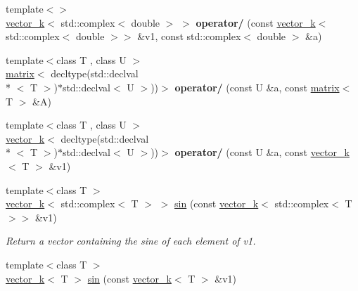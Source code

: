 \begin{DoxyCompactItemize}
\item 
\hypertarget{namespacekeycpp_aef7e4ab9c187ffa93e45ec90e2d1d5d4}{{\footnotesize template$<$$>$ }\\\hyperlink{classkeycpp_1_1vector__k}{vector\-\_\-k}$<$ std\-::complex$<$ double $>$ $>$ {\bfseries operator/} (const \hyperlink{classkeycpp_1_1vector__k}{vector\-\_\-k}$<$ std\-::complex$<$ double $>$$>$ \&v1, const std\-::complex$<$ double $>$ \&a)}\label{namespacekeycpp_aef7e4ab9c187ffa93e45ec90e2d1d5d4}

\item 
\hypertarget{namespacekeycpp_aafc0089bdf204385c1e627755c5070b0}{{\footnotesize template$<$class T , class U $>$ }\\\hyperlink{classkeycpp_1_1matrix}{matrix}$<$ decltype(std\-::declval\\*
$<$ T $>$)$\ast$std\-::declval$<$ U $>$))$>$ {\bfseries operator/} (const U \&a, const \hyperlink{classkeycpp_1_1matrix}{matrix}$<$ T $>$ \&A)}\label{namespacekeycpp_aafc0089bdf204385c1e627755c5070b0}

\item 
\hypertarget{namespacekeycpp_aa5daf45d6627feee18402005fcd83cfd}{{\footnotesize template$<$class T , class U $>$ }\\\hyperlink{classkeycpp_1_1vector__k}{vector\-\_\-k}$<$ decltype(std\-::declval\\*
$<$ T $>$)$\ast$std\-::declval$<$ U $>$))$>$ {\bfseries operator/} (const U \&a, const \hyperlink{classkeycpp_1_1vector__k}{vector\-\_\-k}$<$ T $>$ \&v1)}\label{namespacekeycpp_aa5daf45d6627feee18402005fcd83cfd}

\item 
\hypertarget{namespacekeycpp_a3fad354ed572051e939cc71209c112ab}{{\footnotesize template$<$class T $>$ }\\\hyperlink{classkeycpp_1_1vector__k}{vector\-\_\-k}$<$ std\-::complex$<$ T $>$ $>$ \hyperlink{namespacekeycpp_a3fad354ed572051e939cc71209c112ab}{sin} (const \hyperlink{classkeycpp_1_1vector__k}{vector\-\_\-k}$<$ std\-::complex$<$ T $>$$>$ \&v1)}\label{namespacekeycpp_a3fad354ed572051e939cc71209c112ab}

\begin{DoxyCompactList}\small\item\em Return a vector containing the sine of each element of v1. \end{DoxyCompactList}\item 
\hypertarget{namespacekeycpp_aea600162295a122a2371d75f80f764c5}{{\footnotesize template$<$class T $>$ }\\\hyperlink{classkeycpp_1_1vector__k}{vector\-\_\-k}$<$ T $>$ \hyperlink{namespacekeycpp_aea600162295a122a2371d75f80f764c5}{sin} (const \hyperlink{classkeycpp_1_1vector__k}{vector\-\_\-k}$<$ T $>$ \&v1)}\label{namespacekeycpp_aea600162295a122a2371d75f80f764c5}


\end{DoxyCompactItemize}
